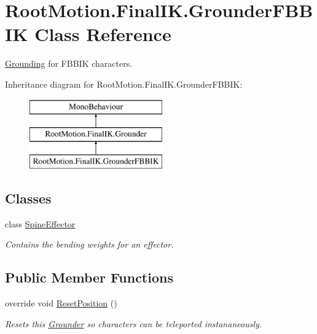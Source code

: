 \hypertarget{class_root_motion_1_1_final_i_k_1_1_grounder_f_b_b_i_k}{}\section{Root\+Motion.\+Final\+I\+K.\+Grounder\+F\+B\+B\+IK Class Reference}
\label{class_root_motion_1_1_final_i_k_1_1_grounder_f_b_b_i_k}


\mbox{\hyperlink{class_root_motion_1_1_final_i_k_1_1_grounding}{Grounding}} for F\+B\+B\+IK characters.  


Inheritance diagram for Root\+Motion.\+Final\+I\+K.\+Grounder\+F\+B\+B\+IK\+:\begin{figure}[H]
\begin{center}
\leavevmode
\includegraphics[height=3.000000cm]{class_root_motion_1_1_final_i_k_1_1_grounder_f_b_b_i_k}
\end{center}
\end{figure}
\subsection*{Classes}
\begin{DoxyCompactItemize}
\item 
class \mbox{\hyperlink{class_root_motion_1_1_final_i_k_1_1_grounder_f_b_b_i_k_1_1_spine_effector}{Spine\+Effector}}
\begin{DoxyCompactList}\small\item\em Contains the bending weights for an effector. \end{DoxyCompactList}\end{DoxyCompactItemize}
\subsection*{Public Member Functions}
\begin{DoxyCompactItemize}
\item 
override void \mbox{\hyperlink{class_root_motion_1_1_final_i_k_1_1_grounder_f_b_b_i_k_ad901ae9bce541cb70d2913643dda8e82}{Reset\+Position}} ()
\begin{DoxyCompactList}\small\item\em Resets this \mbox{\hyperlink{class_root_motion_1_1_final_i_k_1_1_grounder}{Grounder}} so characters can be teleported instananeously. \end{DoxyCompactList}\end{DoxyCompactItemize}
